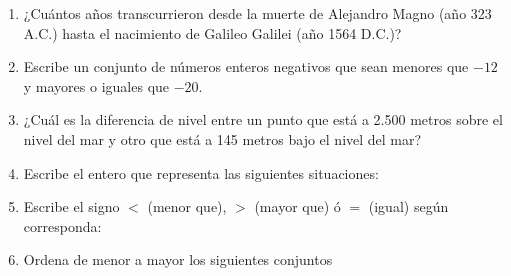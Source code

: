 \documentclass[letterpaper,fleqn]{article}
\begin{document}
\begin{enumerate}
\item ¿Cuántos años transcurrieron desde la muerte de Alejandro Magno (año 323 A.C.) hasta el nacimiento de Galileo Galilei (año 1564 D.C.)? \noanswer
\item Escribe un conjunto de números enteros negativos que sean menores que $-12$ y mayores o iguales que $-20$.\noanswer
\item ¿Cuál es la diferencia de nivel entre un punto que está a 2.500 metros sobre el nivel del mar y otro que está a 145 metros bajo el nivel del mar? \noanswer
 \item Escribe el entero que representa  las  siguientes situaciones:
  \begin{enumerate}
     \end{enumerate}
\item Escribe el signo $<$ (menor que), $>$ (mayor que) ó $=$ (igual)  según corresponda:
\begin{enumerate}
\end{enumerate}
\item Ordena de menor a mayor los siguientes conjuntos
\begin{enumerate}

\end{enumerate}
\end{enumerate}
\end{document}

